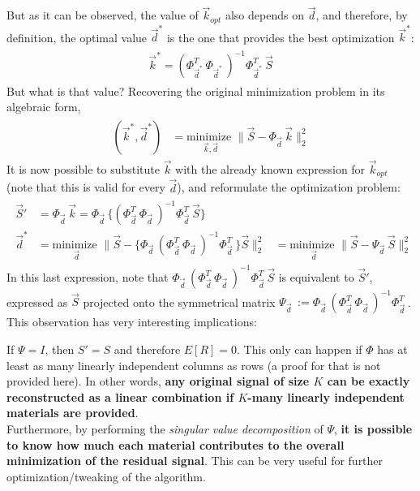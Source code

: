 \documentclass[11pt]{scrartcl} %
\begin{document}
But as it can be observed, the value of \(\vec{k}_{opt}\) also depends on \(\vec{d}\), and therefore, by definition, the optimal value \(\vec{d}^*\) is the one that provides the best optimization \(\vec{k}^*\):
\begin{align*}
    \begin{aligned}
      \vec{k}^* =  (\Phi_{\vec{d}^*\;}^T \Phi_{\vec{d}^*\;})^{-1} \Phi_{\vec{d}^*\;}^T\vec{S}
    \end{aligned}
\end{align*}
But what is that value? Recovering the original minimization problem in its algebraic form,
\begin{align*}
  \begin{aligned}
    (\vec{k}^*, \vec{d}^*) &= \underset{\vec{k}, \vec{d}}{\text{minimize }}
    \bigg\lVert \vec{S}-\Phi_{\vec{d}\;} \vec{k}\bigg\rVert_2^2
    \end{aligned}
\end{align*}
It is now possible to substitute \(\vec{k}\) with the already known expression for \(\vec{k}_{opt}\) (note that this is valid for every \(\vec{d}\)), and reformulate the optimization problem:
\begin{align*}
  \begin{aligned}
    \vec{S}'  &= \Phi_{\vec{d}\;} \vec{k}= \Phi_{\vec{d}\;} \Big\{(\Phi_{\vec{d}\;}^T \Phi_{\vec{d}\;})^{-1} \Phi_{\vec{d}\;}^T\vec{S} \Big\}\\[10pt]
    \vec{d}^* &= \underset{\vec{d}}{\text{minimize }}
    \bigg\lVert \vec{S}-\Big\{\Phi_{\vec{d}\;} (\Phi_{\vec{d}\;}^T \Phi_{\vec{d}\;})^{-1} \Phi_{\vec{d}\;}^T\Big\}\vec{S} \bigg\rVert_2^2 &= \underset{\vec{d}}{\text{minimize }}
    \bigg\lVert \vec{S}- \Psi_{\vec{d}\;} \vec{S} \bigg\rVert_2^2
    \end{aligned}
\end{align*}
In this last expression, note that \(\Phi_{\vec{d}\;} (\Phi_{\vec{d}\;}^T \Phi_{\vec{d}\;})^{-1} \Phi_{\vec{d}\;}^T\vec{S} \) is equivalent to \(\vec{S}'\), expressed as \(\vec{S}\) projected onto the symmetrical matrix \(\Psi_{\vec{d}\;} := \Phi_{\vec{d}\;} (\Phi_{\vec{d}\;}^T \Phi_{\vec{d}\;})^{-1} \Phi_{\vec{d}\;}^T\).\\[7pt]
This observation has very interesting implications:
  \begin{tcolorbox}
    If \(\Psi=I\), then \(S'=S\) and therefore \(E[R]=0\). This only can happen if \(\Phi\) has at least as many linearly independent columns as rows (a proof for that is not provided here). In other words, \textbf{any original signal of size \(K\) can be exactly reconstructed as a linear combination if \(K\)-many linearly independent materials are provided}.\\
    Furthermore, by performing the {\it singular value decomposition} of \(\Psi\), \textbf{it is possible to know how much each material contributes to the overall minimization of the residual signal}. This can be very useful for further optimization/tweaking of the algorithm.
  \end{tcolorbox}
\end{document}
